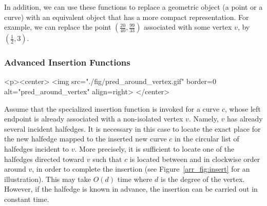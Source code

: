 In addition, we can use these functions to replace a geometric
object (a point or a curve) with an equivalent object that has a
more compact representation. For example, we can replace the point
$(\frac{20}{40}, \frac{99}{33})$ associated with some vertex $v$,
by $(\frac{1}{2}, 3)$.

\newpage
\begin{ccAdvanced}
\subsubsection{Advanced Insertion Functions}
\label{arr_sssec:adv_insert}

\lcTex{%
  \setlength{\widthRight}{2.5cm}
  \setlength{\widthLeft}{\widthLineReal}
  \addtolength{\widthLeft}{-\widthRight}
  \begin{minipage}{\widthLeft}
}
\begin{ccHtmlOnly}
  <p><center>
    <img src="./fig/pred_around_vertex.gif" border=0 alt="pred_around_vertex" align=right>
  </center>
\end{ccHtmlOnly}
Assume that the specialized insertion function
 is invoked for a curve $c$,
whose left endpoint is already associated with a non-isolated
vertex $v$.  Namely, $v$ has already several incident halfedges. It
is necessary in this case to locate the exact place for the
new halfedge mapped to the inserted new curve $c$ in the circular
list of halfedges incident to $v$. More precisely, it is sufficient
to locate one of the halfedges  directed toward $v$ such
that $c$ is located between  and  in
clockwise order around $v$, in order to complete the insertion
(see Figure~\ref{arr_fig:insert} for an illustration). This may
take $O(d)$ time where $d$ is the degree of the vertex. However,
if the halfedge  is known in advance, the insertion can
be carried out in constant time.


\end{ccAdvanced}
